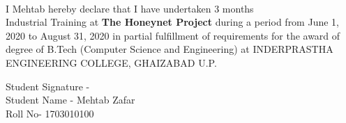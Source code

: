 \newpage
\thispagestyle{empty}

\begin{center}
\\[1.5cm]
\begin{flushleft}
I Mehtab hereby declare that I have undertaken 3 months \\
Industrial Training at \textbf{The Honeynet Project} during a period from June 1, 2020 to August 31, 2020 in partial fulfillment of requirements for the award of degree of B.Tech (Computer Science and Engineering) at INDERPRASTHA ENGINEERING COLLEGE, GHAIZABAD U.P.
\end{flushleft}
\vfill
\begin{flushleft}
Student Signature - \\
Student Name - Mehtab Zafar\\
Roll No- 1703010100\\
\\[0.5cm]
\end{flushleft}

\end{center}

\vfill